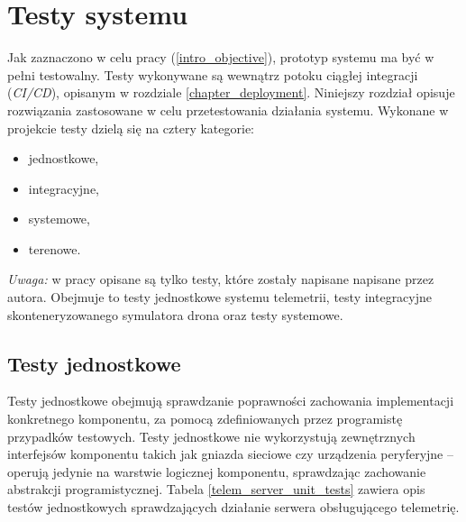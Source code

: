\chapter{Testy systemu} \label{chapter_tests}

Jak zaznaczono w celu pracy (\ref{intro_objective}), prototyp systemu
ma być w pełni testowalny. Testy wykonywane są wewnątrz potoku ciągłej integracji 
(\textit{CI/CD}), opisanym w rozdziale \ref{chapter_deployment}. Niniejszy rozdział opisuje
rozwiązania zastosowane w celu przetestowania działania systemu.
Wykonane w projekcie testy dzielą się na cztery kategorie:

\begin{itemize}
    \item jednostkowe,
    \item integracyjne,
    \item systemowe,
    \item terenowe.
\end{itemize}

\noindent
\textit{Uwaga:} w pracy opisane są tylko testy, które zostały
napisane napisane przez autora. Obejmuje to testy jednostkowe systemu telemetrii,
testy integracyjne skonteneryzowanego symulatora drona oraz testy systemowe.

\section{Testy jednostkowe}

Testy jednostkowe obejmują sprawdzanie poprawności zachowania implementacji 
konkretnego komponentu, za pomocą zdefiniowanych przez programistę
przypadków testowych. Testy jednostkowe nie wykorzystują zewnętrznych 
interfejsów komponentu takich jak gniazda sieciowe czy urządzenia peryferyjne --
operują jedynie na warstwie logicznej komponentu, sprawdzając zachowanie 
abstrakcji programistycznej.
Tabela \ref{telem_server_unit_tests} zawiera 
opis testów jednostkowych sprawdzających działanie serwera
obsługującego telemetrię.

